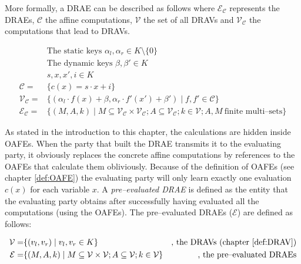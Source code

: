 More formally, a DRAE can be described as follows where
$\mathcal{E}_\mathcal{C}$ represents the DRAEs, $\mathcal{C}$ the affine
computations, $\mathcal{V}$ the set of all DRAVs and $\mathcal{V}_\mathcal{C}$
the computations that lead to DRAVs.

\begin{align}
%
  &\text{The static keys } \alpha_l, \alpha_r \in K \setminus \{0\} \nonumber\\
%
  &\text{The dynamic keys } \beta, \beta' \in K \nonumber\\
%
  &s, x, x', i \in K \nonumber\\
%
  \mathcal{C} = & \{ c(x) = s \cdot x + i \} \nonumber\\
%
  \mathcal{V}_\mathcal{C} = & \{ (\alpha_l \cdot f(x) + \beta,
                      \alpha_r \cdot f'(x') + \beta' )
                    \mid f, f' \in \mathcal{C} \} \nonumber\\
%
  \label{rel:DRAE}
  \mathcal{E}_\mathcal{C} = & \{ (M, A, k) \mid
      M \subseteq \mathcal{V}_\mathcal{C} \times
      \mathcal{V}_\mathcal{C}; A \subseteq \mathcal{V}_\mathcal{C};
      k \in \mathcal{V};
      A, M~\text{finite multi--sets} \}
%
\end{align}

As stated in the introduction to this chapter, the calculations are hidden
inside OAFEs. When the party that built the DRAE transmits it to the evaluating
party, it obviously replaces the concrete affine computations by references to
the OAFEs that calculate them obliviously.  Because of the definition of OAFEs
(see chapter \ref{def:OAFE}) the evaluating party will only learn exactly one
evaluation $c(x)$ for each variable $x$. A \emph{pre--evaluated DRAE} is defined
as the entity that the evaluating party obtains after successfully having
evaluated all the computations (using the OAFEs). The pre--evaluated DRAEs
($\mathcal{E}$) are defined as follows:

\begin{align}
  \mathcal{V} = & \{ (v_l, v_r) \mid v_l, v_r \in K \}
  &\text{, the DRAVs (chapter \ref{def:DRAV})} \nonumber\\
%
  \label{rel:pre-eval-DRAE}
  \mathcal{E} = & \{ (M, A, k) \mid
      M \subseteq \mathcal{V} \times \mathcal{V};
      A \subseteq \mathcal{V};
      k \in \mathcal{V} \}
      &\text{, the pre--evaluated DRAEs}
\end{align}


\label{sec:DRAE-decoding}

